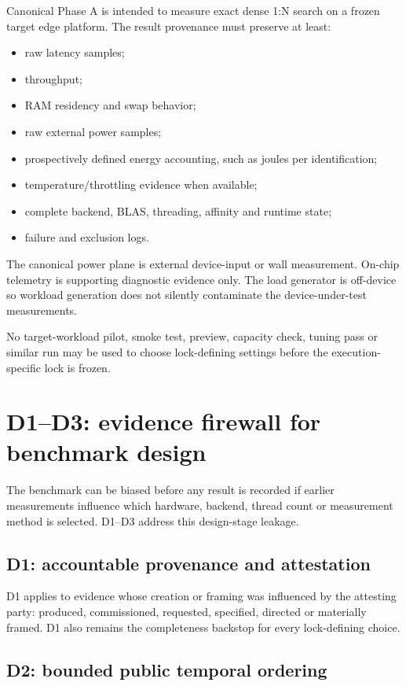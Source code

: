 \documentclass[10pt,a4paper]{article}
\begin{document}
Canonical Phase A is intended to measure exact dense 1:N search on a frozen target edge platform. The result
provenance must preserve at least:

\begin{itemize}
\item raw latency samples;
\item throughput;
\item RAM residency and swap behavior;
\item raw external power samples;
\item prospectively defined energy accounting, such as joules per identification;
\item temperature/throttling evidence when available;
\item complete backend, BLAS, threading, affinity and runtime state;
\item failure and exclusion logs.
\end{itemize}

The canonical power plane is external device-input or wall measurement. On-chip telemetry is supporting
diagnostic evidence only. The load generator is off-device so workload generation does not silently contaminate
the device-under-test measurements.

No target-workload pilot, smoke test, preview, capacity check, tuning pass or similar run may be used to choose
lock-defining settings before the execution-specific lock is frozen.

\section{D1--D3: evidence firewall for benchmark design}

The benchmark can be biased before any result is recorded if earlier measurements influence which hardware,
backend, thread count or measurement method is selected. D1--D3 address this design-stage leakage.

\subsection{D1: accountable provenance and attestation}

D1 applies to evidence whose creation or framing was influenced by the attesting party: produced, commissioned,
requested, specified, directed or materially framed. D1 also remains the completeness backstop for every
lock-defining choice.

\subsection{D2: bounded public temporal ordering}
\end{document}
